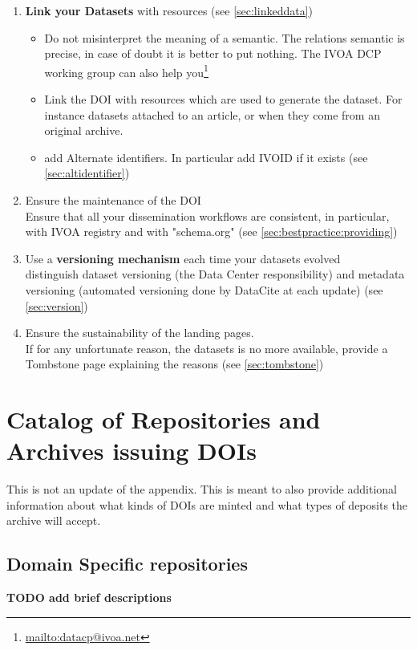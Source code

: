 \documentclass[11pt,a4paper]{ivoa}
\begin{document}
\begin{enumerate}
	\item \textbf{Link your Datasets} with resources (see \ref{sec:linkeddata})
	\begin{itemize}	
		\item Do not misinterpret the meaning of a semantic. The relations semantic is precise, in case of doubt it is better to put nothing. 
		The IVOA DCP working group can also help you\footnote{\url{mailto:datacp@ivoa.net}}
		\item Link the DOI with resources which are used to generate the dataset. For instance datasets attached to an article, or when they come from an original archive.
		\item add Alternate identifiers. In particular add IVOID if it exists (see \ref{sec:altidentifier})
	\end{itemize}
	\item Ensure the maintenance of the DOI\\
	Ensure that all your dissemination workflows are consistent, in particular, with IVOA registry and with "schema.org" (see \ref{sec:bestpractice:providing})
	\item Use a \textbf{versioning mechanism} each time your datasets evolved\\
	distinguish dataset versioning (the Data Center responsibility) and metadata versioning (automated versioning done by DataCite at each update) (see \ref{sec:version})
	\item Ensure the sustainability of the landing pages.\\
	If for any unfortunate reason, the datasets is no more available, provide a Tombstone page explaining the reasons (see \ref{sec:tombstone})
\end{enumerate}


\appendix
\section{Catalog of Repositories and Archives issuing DOIs}
\label{sec:catalog}

This is not an update of the \citet{2022ApJS..260....5C} appendix. 
This is meant to also provide additional information about what kinds of DOIs are minted and what types of deposits the archive will accept.

\subsection{Domain Specific repositories}
\textbf{\color{red}  TODO add brief descriptions}\\
\end{document}
